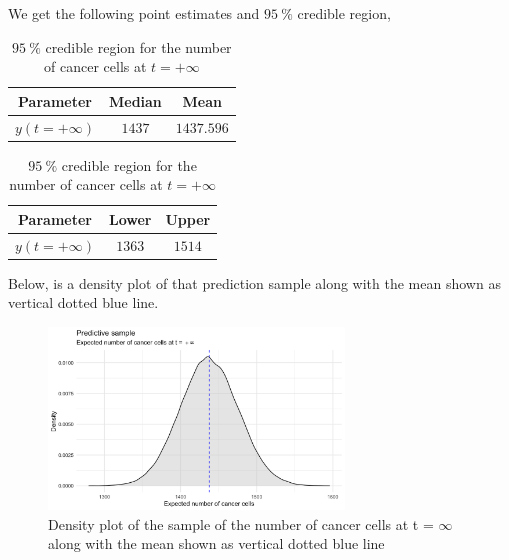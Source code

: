 We get the following point estimates and $\SI{95}{\percent}$ credible region,
\begin{table}[H]
	\parbox{0.45\linewidth}{
		\centering
		\begin{tabular}{|c|c|c|} \hline 
			Parameter 						& Median 		& Mean \\ \hline 
			$y(t = +\infty)$ 				& $1437$ 		& $1437.596$ \\ \hline
		\end{tabular}
		\caption{Point estimates for the number of cancer cells at $t = +\infty$}
		\label{tab:metropolis-vw-point-estimates-cancer-cells}
	}
	\hfill
	\parbox{0.45\linewidth}{
		\centering
		\begin{tabular}{|c|c|c|} \hline 
			Parameter 						& Lower 		& Upper \\ \hline 
			$y(t = +\infty)$ 				& $1363$  		& $1514$ \\ \hline
		\end{tabular}
		\caption{$\SI{95}{\percent}$ credible region for the number of cancer cells at $t = +\infty$}
		\label{tab:metropolis-vw-credible-region-cancer-cells}
	}
\end{table}

Below, is a density plot of that prediction sample along with the mean shown as vertical dotted blue line.

\begin{figure}[H]
	\centering
	\includegraphics[width=0.7\textwidth]{figures/jags/sample_expected_cancer_cells_tinf.png}
	\caption{Density plot of the sample of the number of cancer cells at t = $\infty$ along with the mean shown as vertical dotted blue line}
	\label{fig:jags-sample-expected-cancer-cells-tinf}
\end{figure}